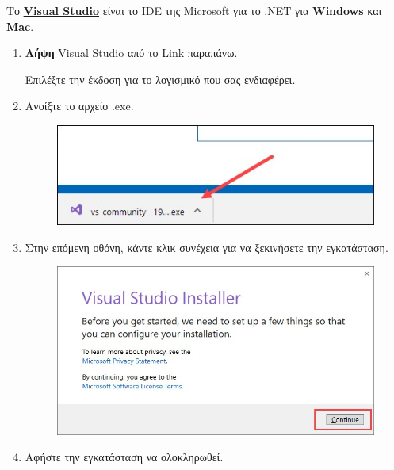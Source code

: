 \setlength{\parindent}{10mm}

Tο \href{https://visualstudio.microsoft.com/downloads/}{\textbf{\uline{Visual Studio}}} είναι το IDE της Microsoft για το .NET για \textbf{Windows} και \textbf{Mac}.

\begin{enumerate}
    \item \textbf{Λήψη} Visual Studio από το Link παραπάνω.
    
    Επιλέξτε την έκδοση για το λογισμικό που σας ενδιαφέρει.
    \item Ανοίξτε το αρχείο .exe.

    \begin{figure}[ht]
        \centering
        \includegraphics[scale=0.4]{images/inst1.jpg}
    \end{figure}

    \item Στην επόμενη οθόνη, κάντε κλικ συνέχεια για να ξεκινήσετε την εγκατάσταση.

    \begin{figure}[ht]
        \centering
        \includegraphics[scale=0.3]{images/inst2.jpg}
    \end{figure}

    \item Αφήστε την εγκατάσταση να ολοκληρωθεί.


\end{enumerate}
